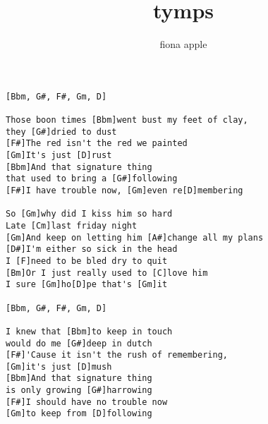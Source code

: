 \author{fiona apple}
\title{tymps}
\maketitle
\begin{verbatim}
[Bbm, G#, F#, Gm, D]

Those boon times [Bbm]went bust my feet of clay,
they [G#]dried to dust
[F#]The red isn't the red we painted
[Gm]It's just [D]rust
[Bbm]And that signature thing 
that used to bring a [G#]following
[F#]I have trouble now, [Gm]even re[D]membering

So [Gm]why did I kiss him so hard
Late [Cm]last friday night
[Gm]And keep on letting him [A#]change all my plans
[D#]I'm either so sick in the head
I [F]need to be bled dry to quit
[Bm]Or I just really used to [C]love him
I sure [Gm]ho[D]pe that's [Gm]it

[Bbm, G#, F#, Gm, D]

I knew that [Bbm]to keep in touch 
would do me [G#]deep in dutch
[F#]'Cause it isn't the rush of remembering,
[Gm]it's just [D]mush
[Bbm]And that signature thing
is only growing [G#]harrowing
[F#]I should have no trouble now
[Gm]to keep from [D]following
\end{verbatim}
